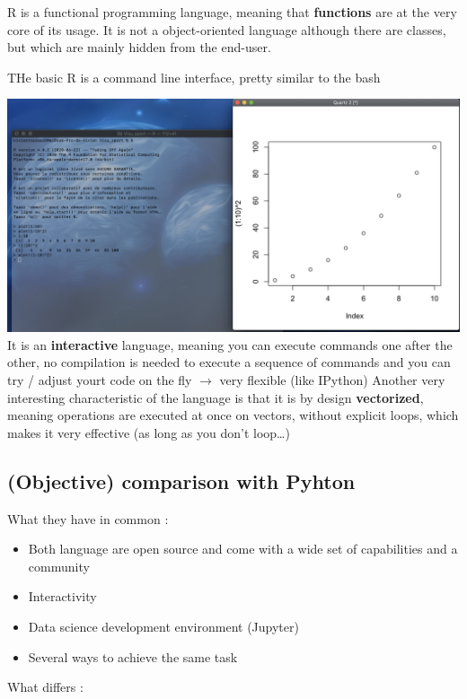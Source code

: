 \documentclass[
]{book}
\providecommand{\tightlist}{%
  \setlength{\itemsep}{0pt}\setlength{\parskip}{0pt}}
\begin{document}
R is a functional programming language, meaning that \textbf{functions} are at the very core of its usage. It is not a object-oriented language although there are classes, but which are mainly hidden from the end-user.

THe basic R is a command line interface, pretty similar to the bash

\includegraphics{img/r-console.png}
It is an \textbf{interactive} language, meaning you can execute commands one after the other, no compilation is needed to execute a sequence of commands and you can try / adjust yourt code on the fly \(\rightarrow\) very flexible (like IPython)
Another very interesting characteristic of the language is that it is by design \textbf{vectorized}, meaning operations are executed at once on vectors, without explicit loops, which makes it very effective (as long as you don't loop\ldots)

\hypertarget{objective-comparison-with-pyhton}{%
\subsection{(Objective) comparison with Pyhton}\label{objective-comparison-with-pyhton}}

What they have in common :

\begin{itemize}
\tightlist
\item
  Both language are open source and come with a wide set of capabilities and a community
\item
  Interactivity
\item
  Data science development environment (Jupyter)
\item
  Several ways to achieve the same task
\end{itemize}

What differs :
\end{document}
